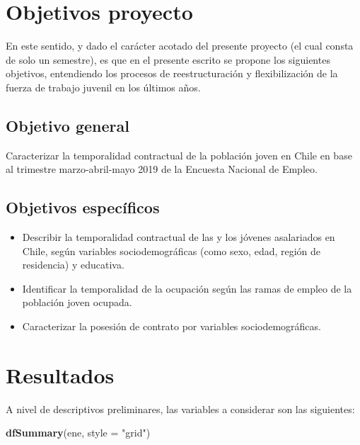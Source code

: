 \documentclass[]{article}
\newenvironment{Shaded}{\begin{snugshade}}{\end{snugshade}}
\newcommand{\DataTypeTok}[1]{\textcolor[rgb]{0.13,0.29,0.53}{#1}}
\newcommand{\KeywordTok}[1]{\textcolor[rgb]{0.13,0.29,0.53}{\textbf{#1}}}
\newcommand{\NormalTok}[1]{#1}
\newcommand{\StringTok}[1]{\textcolor[rgb]{0.31,0.60,0.02}{#1}}
\providecommand{\tightlist}{%
  \setlength{\itemsep}{0pt}\setlength{\parskip}{0pt}}
\begin{document}
\hypertarget{objetivos-proyecto}{%
\section{Objetivos proyecto}\label{objetivos-proyecto}}

En este sentido, y dado el carácter acotado del presente proyecto (el
cual consta de solo un semestre), es que en el presente escrito se
propone los siguientes objetivos, entendiendo los procesos de
reestructuración y flexibilización de la fuerza de trabajo juvenil en
los últimos años.

\hypertarget{objetivo-general}{%
\subsection{Objetivo general}\label{objetivo-general}}

Caracterizar la temporalidad contractual de la población joven en Chile
en base al trimestre marzo-abril-mayo 2019 de la Encuesta Nacional de
Empleo.

\hypertarget{objetivos-especuxedficos}{%
\subsection{Objetivos específicos}\label{objetivos-especuxedficos}}

\begin{itemize}
\tightlist
\item
  Describir la temporalidad contractual de las y los jóvenes asalariados
  en Chile, según variables sociodemográficas (como sexo, edad, región
  de residencia) y educativa.
\item
  Identificar la temporalidad de la ocupación según las ramas de empleo
  de la población joven ocupada.
\item
  Caracterizar la posesión de contrato por variables sociodemográficas.
\end{itemize}

\hypertarget{resultados}{%
\section{Resultados}\label{resultados}}

A nivel de descriptivos preliminares, las variables a considerar son las
siguientes:

\begin{Shaded}
\begin{Highlighting}[]
\KeywordTok{dfSummary}\NormalTok{(ene, }\DataTypeTok{style =} \StringTok{"grid"}\NormalTok{)}
\end{Highlighting}
\end{Shaded}
\end{document}
